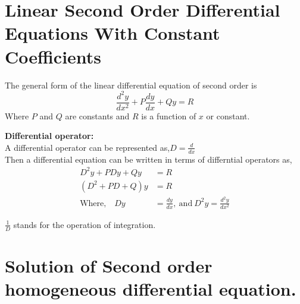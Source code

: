 \section{Linear Second Order Differential Equations With Constant Coefficients}
The general form of the linear differential equation of second order is
$$
\frac{d^{2} y}{d x^{2}}+P \frac{d y}{d x}+Q y=R
$$
Where $P$ and $Q$ are constants and $R$ is a function of $x$ or constant.\begin{note}\textbf{Differential operator:}\\
	A differential operator can be represented as,\quad $D=\frac{d}{dx}$
\\Then a differential equation can be written  in terms of differntial operators as,
\begin{align*}
D^{2} y+P D y+Q y&=R \\ \left(D^{2}+P D+Q\right) y&=R\\
\text{Where,}\quad D y&=\frac{d y}{d x}, \ \text{and}\ D^{2} y=\frac{d^{2} y}{d x^{2}}
\end{align*}

$\frac{1}{D}$ stands for the operation of integration.	
\end{note}
\section{Solution of Second order homogeneous differential equation.}

